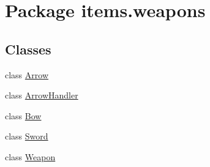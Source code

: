 \hypertarget{namespaceitems_1_1weapons}{}\section{Package items.\+weapons}
\label{namespaceitems_1_1weapons}
\subsection*{Classes}
\begin{DoxyCompactItemize}
\item 
class \mbox{\hyperlink{classitems_1_1weapons_1_1_arrow}{Arrow}}
\item 
class \mbox{\hyperlink{classitems_1_1weapons_1_1_arrow_handler}{Arrow\+Handler}}
\item 
class \mbox{\hyperlink{classitems_1_1weapons_1_1_bow}{Bow}}
\item 
class \mbox{\hyperlink{classitems_1_1weapons_1_1_sword}{Sword}}
\item 
class \mbox{\hyperlink{classitems_1_1weapons_1_1_weapon}{Weapon}}
\end{DoxyCompactItemize}
